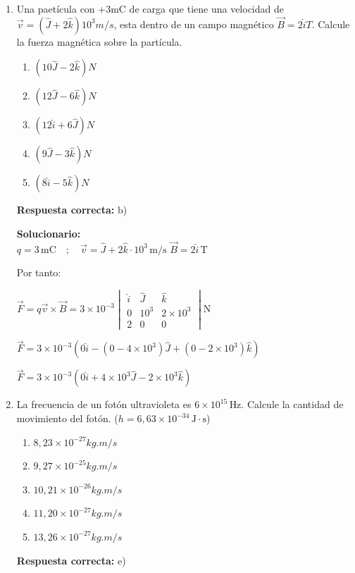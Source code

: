 \begin{enumerate}
	
	
	
	
	\vspace{6mm}
	
	\item Una paetícula con +3mC de carga que tiene una velocidad de $\vec{v}=(\hat{J}+2\hat{k})10^3m/s$, esta dentro de un campo magnético $\vec{B}=2\hat{i}T$. Calcule la fuerza magnética sobre la partícula.
	\begin{enumerate}[label=\alph*)]
		\item $(10\hat{J}-2\hat{k})N$
		\item $(12\hat{J}-6\hat{k})N$
		\item $(12\hat{i}+ 6\hat{J})N$
		\item $(9\hat{J}-3\hat{k})N$
		\item $(8\hat{i}-5\hat{k})N$
	\end{enumerate}
	\textbf{Respuesta correcta:} b)
	
	\vspace{2mm}
	\textbf{Solucionario:}\\

	$q = 3 \, \text{mC} \quad ; \quad \vec{v} = \hat{J} + 2\hat{k} \cdot 10^3 \, \text{m/s}$
	 $\vec{B} = 2\hat{i} \, \text{T}$
	
	Por tanto:
	
	$\vec{F} = q \vec{v} \times \vec{B} = 3 \times 10^{-3} 
	\begin{vmatrix} 
		\hat{i} & \hat{J} & \hat{k} \\ 
		0 & 10^3 & 2 \times 10^3 \\ 
		2 & 0 & 0 
	\end{vmatrix} \text{N}$
	
	$\vec{F} = 3 \times 10^{-3} (0\hat{i} - (0 - 4 \times 10^3)\hat{J} + (0 - 2 \times 10^3)\hat{k})$
	
	$\vec{F} = 3 \times 10^{-3} (0\hat{i} + 4 \times 10^3\hat{J} - 2 \times 10^3\hat{k})$
	
	
	\vspace{6mm}
	
		\item La frecuencia de un fotón ultravioleta es $6 \times 10^{15} \, \text{Hz}$. Calcule la cantidad de movimiento del fotón. ($h = 6,63 \times 10^{-34} \, \text{J}\cdot\text{s}$)
	\begin{enumerate}[label=\alph*)]
		\item $8,23\times10^{-27} kg. m/s$
		\item $9,27\times10^{-25} kg. m/s$
		\item $10,21\times10^{-26} kg. m/s$
		\item $11,20\times10^{-27} kg. m/s$
		\item $13,26\times10^{-27} kg. m/s$
	\end{enumerate}
	\textbf{Respuesta correcta:} e)
	

\end{enumerate}
